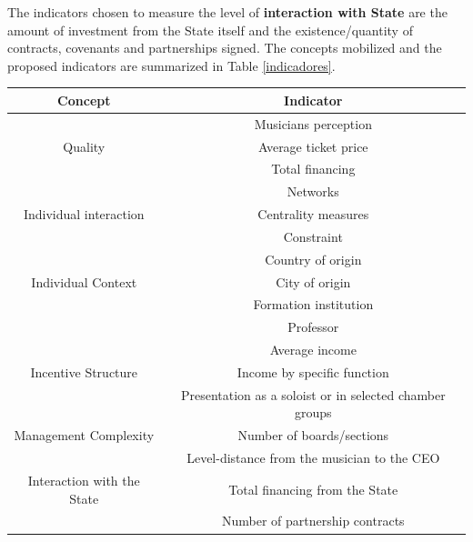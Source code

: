 \documentclass[a4paper, 12pt, openright, oneside, german, french, brazil, english]{abntex2}
\begin{document}
	
	The indicators chosen to measure the level of \textbf{interaction with State} are the amount of investment from the State itself and the existence/quantity of contracts, covenants and partnerships signed. The concepts mobilized and the proposed indicators are summarized in Table \ref{indicadores}.
	
	
	
	\begin{table}[ht]
		{\begin{tabular}{|c|c|}
				
				\hline
				\textbf{Concept} & \textbf{Indicator} \\
				\hline
				&  Musicians perception \\
				Quality  &  Average ticket price \\
				&  Total financing \\
				\hline
				
				& Networks \\
				Individual interaction & Centrality measures  \\
				& Constraint      \\
				\hline
				& Country of origin  \\
				Individual Context & City of origin  \\
				& Formation institution \\
				& Professor    \\
				\hline
				& Average income  \\
				Incentive Structure & Income by specific function \\
				& Presentation as a soloist or in selected chamber groups \\
				\hline
				Management Complexity  & Number of boards/sections  \\
				& Level-distance from the musician to the CEO \\
				\hline
				Interaction with the State  & Total financing from the State  \\
				& Number of partnership contracts \\
				\hline
				
				
			\end{tabular}
		}
		{}
        \end{table}
\end{document}
